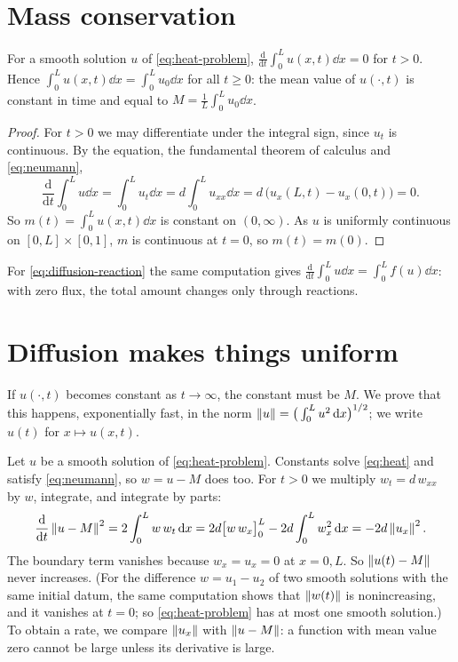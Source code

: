 \section{Mass conservation}\label{sec:diffusion-mass}

\begin{proposition}\label{prop:mass-conservation}
For a smooth solution $u$ of \eqref{eq:heat-problem},
$\frac{\mathrm d}{\mathrm dt}\int_0^Lu(x,t)\dd x=0$ for $t>0$. Hence
$\int_0^Lu(x,t)\dd x=\int_0^Lu_0\dd x$ for all $t\ge0$: the mean value of $u(\cdot,t)$
is constant in time and equal to $M=\frac1L\int_0^Lu_0\dd x$.
\end{proposition}

\begin{proof}
For $t>0$ we may differentiate under the integral sign, since $u_t$ is continuous.
By the equation, the fundamental theorem of calculus and \eqref{eq:neumann},
\begin{equation*}
  \frac{\mathrm d}{\mathrm dt}\int_0^L u\dd x = \int_0^L u_t\dd x
  = d\int_0^L u_{xx}\dd x = d\,\big(u_x(L,t)-u_x(0,t)\big) = 0 .
\end{equation*}
So $m(t)=\int_0^Lu(x,t)\dd x$ is constant on $(0,\infty)$. As $u$ is uniformly
continuous on $[0,L]\times[0,1]$, $m$ is continuous at $t=0$, so $m(t)=m(0)$.
\end{proof}

For \eqref{eq:diffusion-reaction} the same computation gives
$\frac{\mathrm d}{\mathrm dt}\int_0^Lu\dd x=\int_0^Lf(u)\dd x$: with zero flux,
the total amount changes only through reactions.

\section{Diffusion makes things uniform}\label{sec:diffusion-energy}

If $u(\cdot,t)$ becomes constant as $t\to\infty$, the constant must be $M$. We prove
that this happens, exponentially fast, in the norm
$\left\lVert u\right\rVert=\big(\int_0^Lu^2\,\mathrm{d} x\big)^{1/2}$; we write $u(t)$ for $x\mapsto u(x,t)$.

Let $u$ be a smooth solution of \eqref{eq:heat-problem}. Constants solve
\eqref{eq:heat} and satisfy \eqref{eq:neumann}, so $w=u-M$ does too. For $t>0$ we
multiply $w_t=d\,w_{xx}$ by $w$, integrate, and integrate by parts:
\begin{equation}\label{eq:diffusion-energy}
  \frac{\mathrm d}{\mathrm dt}\left\lVert u-M\right\rVert^2
  = 2\int_0^L w\,w_t\,\mathrm{d} x
  = 2d\big[w\,w_x\big]_0^L - 2d\int_0^L w_x^2\,\mathrm{d} x
  = -2d\left\lVert u_x\right\rVert^2 .
\end{equation}
The boundary term vanishes because $w_x=u_x=0$ at $x=0,L$. So $\left\lVert u(t)-M\right\rVert$ never
increases. (For the difference $w=u_1-u_2$ of two smooth solutions with the same
initial datum, the same computation shows that $\left\lVert w(t)\right\rVert$ is nonincreasing, and
it vanishes at $t=0$; so \eqref{eq:heat-problem} has at most one smooth solution.)
To obtain a rate, we compare $\left\lVert u_x\right\rVert$ with $\left\lVert u-M\right\rVert$: a function with mean
value zero cannot be large unless its derivative is large.

